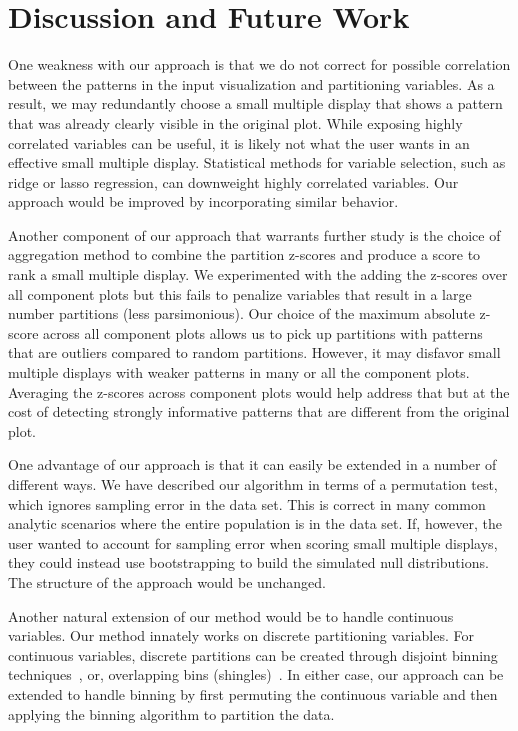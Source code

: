 \section{Discussion and Future Work}
\label{sec:discussion}
One weakness with our approach is that we do not correct for possible correlation between the patterns in the input visualization and partitioning variables. As a result, we may redundantly choose a small multiple display that shows a pattern that was already clearly visible in the original plot. While exposing highly correlated variables can be useful, it is likely not what the user wants in an effective small multiple display. Statistical methods for variable selection, such as ridge or lasso regression, can downweight highly correlated variables. Our approach would be improved by incorporating similar behavior. 

Another component of our approach that warrants further study is the choice of aggregation method to combine the partition z-scores and produce a score to rank a small multiple display. We experimented with the adding the z-scores over all component plots but this fails to penalize variables that result in a large number partitions (less parsimonious). Our choice of the maximum absolute z-score across all component plots allows us to pick up partitions with patterns that are outliers compared to random partitions. However, it may disfavor small multiple displays with weaker patterns in many or all the component plots. Averaging the z-scores across component plots would help address that but at the cost of detecting strongly informative patterns that are different from the original plot. 

One advantage of our approach is that it can easily be extended in a number of different ways. We have described our algorithm in terms of a permutation test, which ignores sampling error in the data set. This is correct in many common analytic scenarios where the entire population is in the data set. If, however, the user wanted to account for sampling error when scoring small multiple displays, they could instead use bootstrapping to build the simulated null distributions. The structure of the approach would be unchanged.

Another natural extension of our method would be to handle continuous variables. Our method innately works on discrete partitioning variables. For continuous variables, discrete partitions can be created through disjoint binning techniques~\cite{Freedman1981,Scott2009}, or, overlapping bins (shingles)~\cite{Becker1996}. In either case, our approach can be extended to handle binning by first permuting the continuous variable and then applying the binning algorithm to partition the data.

